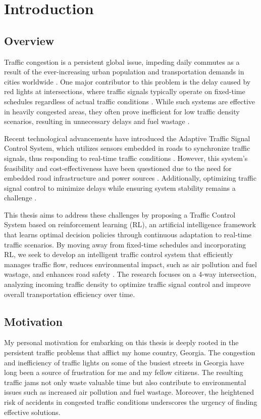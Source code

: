 \chapter{Introduction}
\section{Overview}
Traffic congestion is a persistent global issue, impeding daily commutes as a result of the ever-increasing urban population and transportation demands in cities worldwide \cite{leveinson1998speed}\cite{tirachini2013estimation}. One major contributor to this problem is the delay caused by red lights at intersections, where traffic signals typically operate on fixed-time schedules regardless of actual traffic conditions \cite{mousavi2017traffic}. While such systems are effective in heavily congested areas, they often prove inefficient for low traffic density scenarios, resulting in unnecessary delays and fuel wastage \cite{mousavi2017traffic}.

Recent technological advancements have introduced the Adaptive Traffic Signal Control System, which utilizes sensors embedded in roads to synchronize traffic signals, thus responding to real-time traffic conditions \cite{leveinson1998speed}. However, this system's feasibility and cost-effectiveness have been questioned due to the need for embedded road infrastructure and power sources \cite{leveinson1998speed}. Additionally, optimizing traffic signal control to minimize delays while ensuring system stability remains a challenge \cite{mousavi2017traffic}.

This thesis aims to address these challenges by proposing a Traffic Control System based on reinforcement learning (RL), an artificial intelligence framework that learns optimal decision policies through continuous adaptation to real-time traffic scenarios. By moving away from fixed-time schedules and incorporating RL, we seek to develop an intelligent traffic control system that efficiently manages traffic flow, reduces environmental impact, such as air pollution and fuel wastage, and enhances road safety \cite{mousavi2017traffic}. The research focuses on a 4-way intersection, analyzing incoming traffic density to optimize traffic signal control and improve overall transportation efficiency over time.

\section{Motivation}
My personal motivation for embarking on this thesis is deeply rooted in the persistent traffic problems that afflict my home country, Georgia. The congestion and inefficiency of traffic lights on some of the busiest streets in Georgia have long been a source of frustration for me and my fellow citizens. The resulting traffic jams not only waste valuable time but also contribute to environmental issues such as increased air pollution and fuel wastage. Moreover, the heightened risk of accidents in congested traffic conditions underscores the urgency of finding effective solutions.

